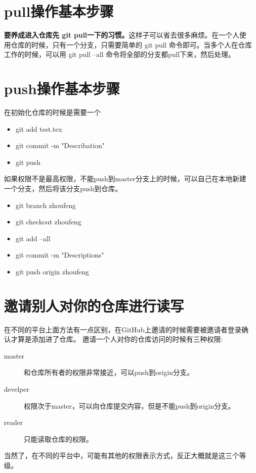 \documentclass[a4paper,12pt]{ctexbook}
\begin{document}
\begin{flushleft}

\section{pull操作基本步骤}
\textbf{要养成进入仓库先 git pull一下的习惯。}这样子可以省去很多麻烦。在一个人使用仓库的时候，只有一个分支，只需要简单的 git pull 命令即可。当多个人在仓库工作的时候，可以用 git pull --all 命令将全部的分支都pull下来，然后处理。

\section{push操作基本步骤}
在初始化仓库的时候是需要一个
\begin{itemize}
   \item git add test.tex
   \item git commit -m "Describation"
   \item git push
\end{itemize}
如果权限不是最高权限，不能push到master分支上的时候，可以自己在本地新建一个分支，然后将该分支push到仓库。
\begin{itemize}
  \item git branch zhoufeng
  \item git checkout zhoufeng
  \item git add --all
  \item git commit -m "Descriptions"
  \item git push origin zhoufeng
\end{itemize}

\section{邀请别人对你的仓库进行读写}
在不同的平台上面方法有一点区别，在GitHub上邀请的时候需要被邀请者登录确认才算是添加进了仓库。
邀请一个人对你的仓库访问的时候有三种权限:
\begin{description}
	\item[master] 和仓库所有者的权限非常接近，可以push到origin分支。
	\item[develper] 权限次于master，可以向仓库提交内容，但是不能push到origin分支。
	\item[reader] 只能读取仓库的权限。
\end{description}
当然了，在不同的平台中，可能有其他的权限表示方式，反正大概就是这三个等级。


\end{flushleft}
\end{document}

